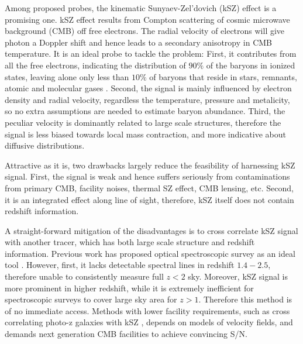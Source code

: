 \documentclass[aps,prd,twocolumn,showpacs,superscriptaddress,groupedaddress,nofootinbib]{revtex4}  %
\begin{document}
Among proposed probes, the kinematic Sunyaev-Zel'dovich (kSZ) effect \cite{Sunyaev72,Sunyaev80,Vishniac87} is a promising one.  
kSZ effect results from Compton scattering of cosmic microwave background (CMB) off free electrons. 
The radial velocity of electrons will give photon a Doppler shift 
and hence leads to a 
secondary anisotropy in CMB temperature.
It is an ideal probe to tackle the problem: 
First, it contributes from all the free electrons, indicating the distribution of $90\%$ of the baryons in ionized states,   
leaving alone only less than $10\%$ of baryons that 
reside in stars, remnants, atomic and molecular gases \cite{Fukugita04}. 
%
Second, the signal is mainly influenced by electron density and radial velocity, 
regardless the temperature, pressure and metalicity,  
so no extra assumptions are needed to estimate baryon abundance.  
%
Third, the peculiar velocity is dominantly related to large scale structures, 
therefore the signal is less biased towards local mass contraction, 
and more indicative about diffusive distributions.  

Attractive as it is, two drawbacks largely reduce the feasibility of harnessing kSZ signal.  
First, the signal is weak 
and hence suffers seriously from contaminations 
from primary CMB, facility noises, 
thermal SZ effect, CMB lensing, etc.  
Second, it is an integrated effect along line of sight, therefore, kSZ itself does not contain redshift information.

A straight-forward mitigation of the disadvantages is to cross correlate 
kSZ signal with another tracer, which has both large scale structure and redshift information. 
Previous work has proposed optical spectroscopic survey as an ideal tool \cite{Hand12,Shao11,Li14}. 
However, first, it lacks detectable spectral lines in redshift $1.4-2.5$, 
therefore unable to consistently measure full $z<2$ sky. 
Moreover, kSZ signal is more prominent in higher redshift, 
while it is extremely inefficient for spectroscopic surveys to cover 
large sky area for $z>1$. 
Therefore this method is of no immediate access. 
%
Methods with lower facility requirements, such as 
cross correlating photo-z galaxies with kSZ \cite{Hill16,Ferraro16}, 
depends on models of velocity fields, 
and demands next generation CMB facilities to achieve 
convincing S/N.
\end{document}

